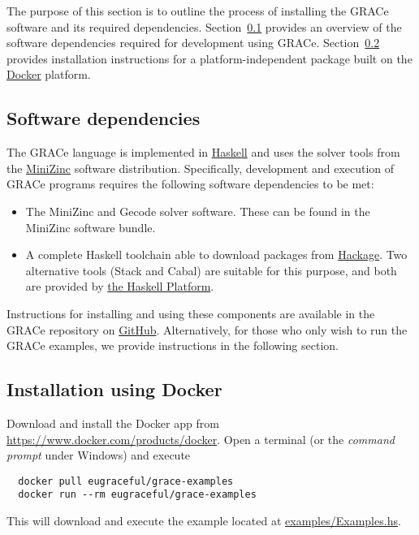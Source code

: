 
The purpose of this section is to outline the process of installing
the GRACe software and its required dependencies.
%
Section~\ref{install-overview} provides an overview of the software
dependencies required for development using GRACe.
%
Section~\ref{install-docker} provides installation instructions for a
platform-independent package built on the
\href{https://www.docker.com/}{Docker} platform.


\subsection{Software dependencies}
\label{install-overview}

The GRACe language is implemented in
\href{https://www.haskell.org/}{Haskell} and uses the solver tools
from the \href{http://www.minizinc.org/}{MiniZinc} software
distribution.
%
Specifically, development and execution of GRACe programs requires the
following software dependencies to be met:

\begin{itemize}
\item The MiniZinc and Gecode solver software.
%
  These can be found in the MiniZinc software bundle.
%
\item A complete Haskell toolchain able to download packages from
  \href{https://hackage.haskell.org/}{Hackage}.
%
  Two alternative tools (Stack and Cabal) are suitable for this
  purpose, and both are provided by
  \href{https://www.haskell.org/platform/}{the Haskell Platform}.
\end{itemize}

Instructions for installing and using these components are available
in the {GRACe} repository on
\href{https://github.com/GRACeFUL-project/%
  GRACe/blob/master/doc/INSTALL.md}{GitHub}.
%
Alternatively, for those who only wish to run the GRACe
examples, we provide instructions in the following section.


\subsection{Installation using Docker}
\label{install-docker}

Download and install the Docker app from \url{https://www.docker.com/products/docker}.
%
Open a terminal (or the \emph{command prompt} under Windows) and
execute
\begin{verbatim}
  docker pull eugraceful/grace-examples
  docker run --rm eugraceful/grace-examples
\end{verbatim}

This will download and execute the example located at
\href{https://github.com/GRACeFUL-project/GRACe/blob/master/examples/Examples.hs}{examples/Examples.hs}.
